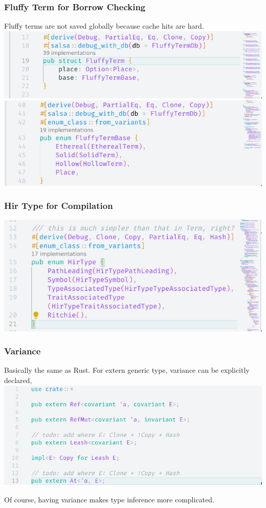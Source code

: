 \documentclass{beamer}   	%
\theoremstyle{definition}
\begin{document}
\begin{frame}
\frametitle{Fluffy Term for Borrow Checking}
Fluffy terms are not saved globally because cache hits are hard.
\includegraphics[width=\linewidth]{snapshots/husky_fluffy_term.png}
\includegraphics[width=\linewidth]{snapshots/husky_fluffy_term2.png}
\end{frame}

\begin{frame}
\frametitle{Hir Type for Compilation}
\includegraphics[width=\linewidth]{snapshots/husky_hir_ty.png}
\end{frame}

\begin{frame}
\frametitle{Variance}
Basically the same as Rust. For extern generic type, variance can be explicitly declared,
\includegraphics[width=\linewidth]{snapshots/husky_variance.png}

Of course, having variance makes type inference more complicated.
\end{frame}
\end{document}
